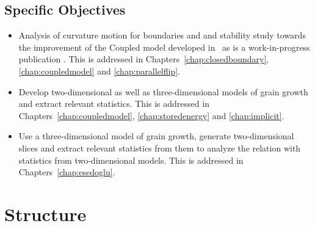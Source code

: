
\subsection{Specific Objectives}
\begin{itemize}
    \item Analysis of curvature motion for boundaries and and stability study towards the improvement of the Coupled model developed in~\cite{bachelorthesisasazo} as is a work-in-progress publication \cite{sazocoupled2018}. This is addressed in Chapters~\ref{chap:closedboundary}, \ref{chap:coupledmodel} and \ref{chap:parallelflip}.
    \item Develop two-dimensional as well as three-dimensional models of grain growth and extract relevant statistics. This is addressed in Chapters~\ref{chap:coupledmodel}, \ref{chap:storedenergy} and \ref{chap:implicit}.
    \item Use a three-dimensional model of grain growth, generate two-dimensional slices and extract relevant statistics from them to analyze the relation with statistics from two-dimensional models. This is addressed in Chapters~\ref{chap:esedoglu}.
\end{itemize}

\section{Structure}

